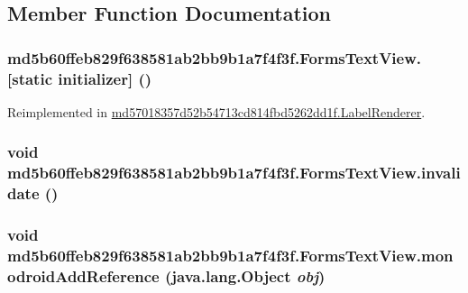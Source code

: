 \subsection{Member Function Documentation}
\hypertarget{classmd5b60ffeb829f638581ab2bb9b1a7f4f3f_1_1_forms_text_view_01f43bb9e6772e31457f7a6ecd45ba1f}{
\subsubsection[{[static initializer]}]{\setlength{\rightskip}{0pt plus 5cm}md5b60ffeb829f638581ab2bb9b1a7f4f3f.FormsTextView.\mbox{[}static initializer\mbox{]} ()}}
\label{classmd5b60ffeb829f638581ab2bb9b1a7f4f3f_1_1_forms_text_view_01f43bb9e6772e31457f7a6ecd45ba1f}




Reimplemented in \hyperlink{classmd57018357d52b54713cd814fbd5262dd1f_1_1_label_renderer_6ab5a62f1e094b7e86c8902176c12c4a}{md57018357d52b54713cd814fbd5262dd1f.LabelRenderer}.\hypertarget{classmd5b60ffeb829f638581ab2bb9b1a7f4f3f_1_1_forms_text_view_93c3c0adf589f26fea5031e1e9b484c3}{
\subsubsection[{invalidate}]{\setlength{\rightskip}{0pt plus 5cm}void md5b60ffeb829f638581ab2bb9b1a7f4f3f.FormsTextView.invalidate ()}}
\label{classmd5b60ffeb829f638581ab2bb9b1a7f4f3f_1_1_forms_text_view_93c3c0adf589f26fea5031e1e9b484c3}


\hypertarget{classmd5b60ffeb829f638581ab2bb9b1a7f4f3f_1_1_forms_text_view_20925dbf92ee998bfae5cc3aca483f3a}{
\subsubsection[{monodroidAddReference}]{\setlength{\rightskip}{0pt plus 5cm}void md5b60ffeb829f638581ab2bb9b1a7f4f3f.FormsTextView.monodroidAddReference (java.lang.Object {\em obj})}}
\label{classmd5b60ffeb829f638581ab2bb9b1a7f4f3f_1_1_forms_text_view_20925dbf92ee998bfae5cc3aca483f3a}





